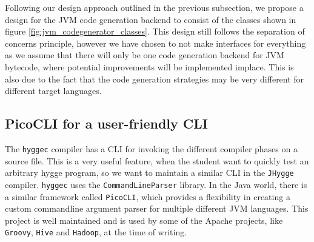 Following our design approach outlined in the previous subsection, we propose a design for the JVM code generation backend to consist of the
classes shown in figure \ref{fig:jvm_codegenerator_classes}. This design still follows the separation of concerns principle, however we have chosen to not make interfaces for everything
as we assume that there will only be one code generation backend for JVM bytecode, where potential improvements will be implemented implace.
This is also due to the fact that the code generation strategies may be very different for different target languages.

\subsection{PicoCLI for a user-friendly CLI}

The \texttt{hyggec} compiler has a CLI for invoking the different compiler phases on a source file. This is a very useful feature,
when the student want to quickly test an arbitrary hygge program, so we want to maintain a similar CLI in the \texttt{JHygge} compiler.
\texttt{hyggec} uses the \texttt{CommandLineParser} library. In the Java world, there is a similar framework called \texttt{PicoCLI},
which provides a flexibility in creating a custom commandline argument parser for multiple different JVM languages. This project
is well maintained and is used by some of the Apache projects, like \texttt{Groovy}, \texttt{Hive} and \texttt{Hadoop}, at the time of writing.
